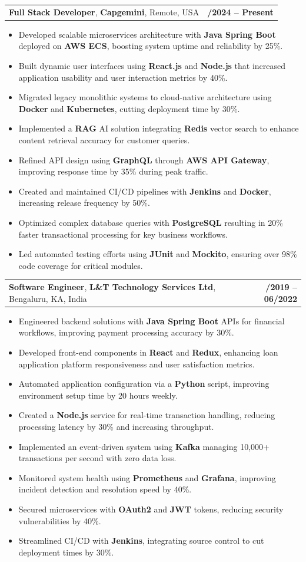 \documentclass[letterpaper,11pt]{article}
\makeatletter
\newcommand{\resumeItem}[1]{
  \item\footnotesize{
    {#1 \vspace{-2pt}}
  }
}
\newcommand{\resumeSubheading}[4]{
  \vspace{-2pt}\item
    \begin{tabular*}{1.0\textwidth}[t]{l@{\extracolsep{\fill}}r}
      \textbf{\fontsize{10pt}{14pt}\selectfont #3}, \textbf{\fontsize{10pt}{14pt}\selectfont #1}, \fontsize{10pt}{14pt}\selectfont #4 & \textbf{\fontsize{10pt}{14pt}\selectfont #2} \\
    \end{tabular*}\vspace{-7pt}
}
\newcommand{\resumeItemListStart}{\begin{itemize}[leftmargin=*]}
\newcommand{\resumeItemListEnd}{\end{itemize}\vspace{-5pt}}
\makeatother
\begin{document}
    \resumeSubheading
        {Capgemini}{01/2024 -- Present}
        {Full Stack Developer}{Remote, USA}
      \resumeItemListStart
        \resumeItem{Developed scalable microservices architecture with \textbf{Java Spring Boot} deployed on \textbf{AWS ECS}, boosting system uptime and reliability by 25\%.}
        \resumeItem{Built dynamic user interfaces using \textbf{React.js} and \textbf{Node.js} that increased application usability and user interaction metrics by 40\%.}
        \resumeItem{Migrated legacy monolithic systems to cloud-native architecture using \textbf{Docker} and \textbf{Kubernetes}, cutting deployment time by 30\%.}
        \resumeItem{Implemented a \textbf{RAG} AI solution integrating \textbf{Redis} vector search to enhance content retrieval accuracy for customer queries.}
        \resumeItem{Refined API design using \textbf{GraphQL} through \textbf{AWS API Gateway}, improving response time by 35\% during peak traffic.}
        \resumeItem{Created and maintained CI/CD pipelines with \textbf{Jenkins} and \textbf{Docker}, increasing release frequency by 50\%.}
        \resumeItem{Optimized complex database queries with \textbf{PostgreSQL} resulting in 20\% faster transactional processing for key business workflows.}
        \resumeItem{Led automated testing efforts using \textbf{JUnit} and \textbf{Mockito}, ensuring over 98\% code coverage for critical modules.}
      \resumeItemListEnd

    \resumeSubheading
        {L\&T Technology Services Ltd}{08/2019 -- 06/2022}
        {Software Engineer}{Bengaluru, KA, India}
      \resumeItemListStart
        \resumeItem{Engineered backend solutions with \textbf{Java Spring Boot} APIs for financial workflows, improving payment processing accuracy by 30\%.}
        \resumeItem{Developed front-end components in \textbf{React} and \textbf{Redux}, enhancing loan application platform responsiveness and user satisfaction metrics.}
        \resumeItem{Automated application configuration via a \textbf{Python} script, improving environment setup time by 20 hours weekly.}
        \resumeItem{Created a \textbf{Node.js} service for real-time transaction handling, reducing processing latency by 30\% and increasing throughput.}
        \resumeItem{Implemented an event-driven system using \textbf{Kafka} managing 10,000+ transactions per second with zero data loss.}
        \resumeItem{Monitored system health using \textbf{Prometheus} and \textbf{Grafana}, improving incident detection and resolution speed by 40\%.}
        \resumeItem{Secured microservices with \textbf{OAuth2} and \textbf{JWT} tokens, reducing security vulnerabilities by 40\%.}
        \resumeItem{Streamlined CI/CD with \textbf{Jenkins}, integrating source control to cut deployment times by 30\%.}
      \resumeItemListEnd
\end{document}

